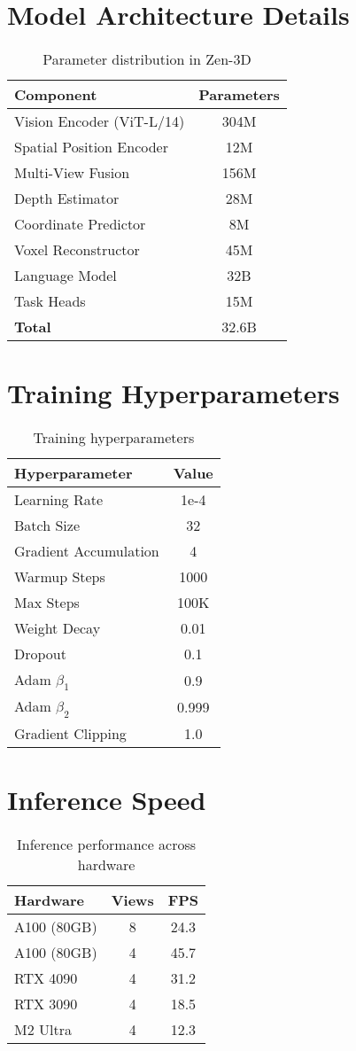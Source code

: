 \documentclass[11pt,a4paper]{article}
\begin{document}
\appendix

\section{Model Architecture Details}

\begin{table}[h]
\centering
\begin{tabular}{lc}
\toprule
Component & Parameters \\
\midrule
Vision Encoder (ViT-L/14) & 304M \\
Spatial Position Encoder & 12M \\
Multi-View Fusion & 156M \\
Depth Estimator & 28M \\
Coordinate Predictor & 8M \\
Voxel Reconstructor & 45M \\
Language Model & 32B \\
Task Heads & 15M \\
\midrule
\textbf{Total} & 32.6B \\
\bottomrule
\end{tabular}
\caption{Parameter distribution in Zen-3D}
\end{table}

\section{Training Hyperparameters}

\begin{table}[h]
\centering
\begin{tabular}{lc}
\toprule
Hyperparameter & Value \\
\midrule
Learning Rate & 1e-4 \\
Batch Size & 32 \\
Gradient Accumulation & 4 \\
Warmup Steps & 1000 \\
Max Steps & 100K \\
Weight Decay & 0.01 \\
Dropout & 0.1 \\
Adam $\beta_1$ & 0.9 \\
Adam $\beta_2$ & 0.999 \\
Gradient Clipping & 1.0 \\
\bottomrule
\end{tabular}
\caption{Training hyperparameters}
\end{table}

\section{Inference Speed}

\begin{table}[h]
\centering
\begin{tabular}{lcc}
\toprule
Hardware & Views & FPS \\
\midrule
A100 (80GB) & 8 & 24.3 \\
A100 (80GB) & 4 & 45.7 \\
RTX 4090 & 4 & 31.2 \\
RTX 3090 & 4 & 18.5 \\
M2 Ultra & 4 & 12.3 \\
\bottomrule
\end{tabular}
\caption{Inference performance across hardware}
\end{table}
\end{document}
